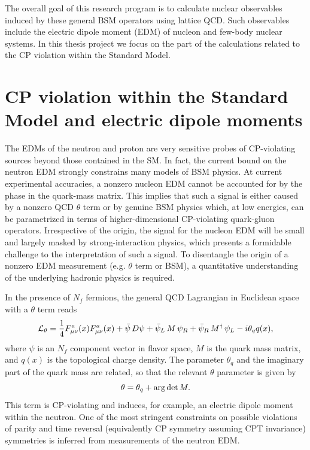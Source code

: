 \documentclass[aps,prc,twocolumn,showpacs,floatfix,nofootinbib,preprintnumbers,superscriptaddress,amsmath,amssymb]{revtex4-1}
\begin{document}
The overall goal of this research program is to calculate nuclear observables induced by these general BSM operators using lattice QCD.  
Such observables include the electric dipole moment (EDM) of nucleon and few-body nuclear systems. 
In this thesis project we focus on the part of the calculations related to the
CP violation within the Standard Model. 


\section*{CP violation within the Standard Model and electric dipole moments}
The EDMs of the neutron and proton are very sensitive probes of CP-violating sources 
beyond those contained in the SM.
In fact, the current bound on the neutron EDM strongly constrains many models of BSM physics. 
At current experimental accuracies, a nonzero nucleon EDM cannot be accounted for by the phase 
in the quark-mass matrix. 
This implies that such a signal is either caused by a nonzero QCD $\theta$ term or 
by genuine BSM physics which, at low energies, 
can be parametrized in terms of higher-dimensional CP-violating quark-gluon operators. 
Irrespective of the origin, the signal for the nucleon EDM will be small and largely 
masked by strong-interaction physics, which presents a formidable challenge to the interpretation
of such a signal.
To disentangle the origin of a nonzero EDM measurement (e.g. $\theta$ term or BSM), 
a quantitative understanding of the underlying hadronic physics is required.

In the presence of $N_f$ fermions, the general QCD Lagrangian in Euclidean space with a $\theta$ term
reads
\begin{equation}
{\cal L_\theta}= {1\over 4} F_{\mu\nu}^a(x)F_{\mu\nu}^a(x)
+ \bar\psi\, D \psi
+ \bar\psi_L \,M\,\psi_R + \bar\psi_R \,M^\dagger\,\psi_L
- i \theta_q q(x),
\end{equation}
where $\psi$ is an $N_f$ component vector in flavor space, $M$ is the
quark mass matrix, and $q(x)$ is the topological charge density.  The parameter
$\theta_q$ and the imaginary part of the quark mass are related, so that the
relevant $\theta$ parameter is given by
\begin{equation}
\theta = \theta_q + {\rm arg}\,{\rm det}\, M.
\label{thetafe}
\end{equation} 
This term is CP-violating and induces, for example,  an electric dipole moment within the neutron.    
One of the most stringent constraints on possible violations of parity and time reversal 
(equivalently CP symmetry assuming CPT invariance) symmetries is inferred from
measurements of the neutron EDM.  
\end{document}
